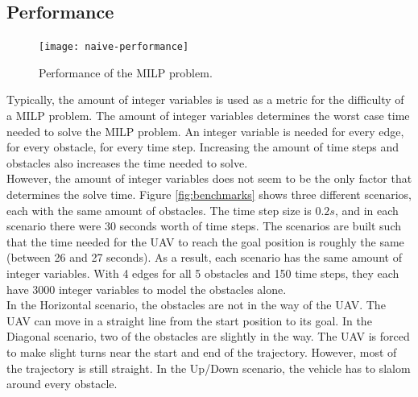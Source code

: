 \subsection{Performance}

\begin{figure}[]
	\centering
	\texttt{[image: naive-performance]}
	\caption{Performance of the MILP problem.}
	\label{fig:naive-performance}
\end{figure}
Typically, the amount of integer variables is used as a metric for the difficulty of a MILP problem. The amount of integer variables determines the worst case time needed to solve the MILP problem. An integer variable is needed for every edge, for every obstacle, for every time step. Increasing the amount of time steps and obstacles also increases the time needed to solve.\\
However, the amount of integer variables does not seem to be the only factor that determines the solve time. Figure \ref{fig:benchmarks} shows three different scenarios, each with the same amount of obstacles. The time step size is $0.2s$, and in each scenario there were 30 seconds worth of time steps. The scenarios are built such that the time needed for the UAV to reach the goal position is roughly the same (between 26 and 27 seconds). As a result, each scenario has the same amount of integer variables. With 4 edges for all 5 obstacles and 150 time steps, they each have 3000 integer variables to model the obstacles alone.\\

In the Horizontal scenario, the obstacles are not in the way of the UAV. The UAV can move in a straight line from the start position to its goal. In the Diagonal scenario, two of the obstacles are slightly in the way. The UAV is forced to make slight turns near the start and end of the trajectory. However, most of the trajectory is still straight. In the Up/Down scenario, the vehicle has to slalom around every obstacle.\\


